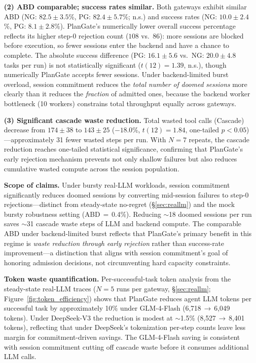 \documentclass[sigconf,review,anonymous]{acmart}
\begin{document}
\noindent\textbf{(2) ABD comparable; success rates similar.}
Both gateways exhibit similar ABD (NG: $82.5\pm3.5$\%, PG: $82.4\pm5.7$\%; n.s.) and success rates (NG: $10.0\pm2.4$\%, PG: $8.1\pm2.8$\%). PlanGate's numerically lower overall success percentage reflects its higher step-0 rejection count ($108$ vs.\ $86$): more sessions are blocked before execution, so fewer sessions enter the backend and have a chance to complete. The absolute success difference (PG: $16.1\pm5.6$ vs.\ NG: $20.0\pm4.8$ tasks per run) is not statistically significant ($t(12){=}1.39$, n.s.), though numerically PlanGate accepts fewer sessions. Under backend-limited burst overload, session commitment reduces the \emph{total number of doomed sessions} more clearly than it reduces the \emph{fraction} of admitted ones, because the backend worker bottleneck (10 workers) constrains total throughput equally across gateways.

\noindent\textbf{(3) Significant cascade waste reduction.}
Total wasted tool calls (Cascade) decrease from $174\pm38$ to $143\pm25$ ($-18.0$\%, $t(12){=}1.84$, one-tailed $p{<}0.05$)---approximately 31 fewer wasted steps per run. With $N{=}7$ repeats, the cascade reduction reaches one-tailed statistical significance, confirming that PlanGate's early rejection mechanism prevents not only shallow failures but also reduces cumulative wasted compute across the session population.

\textbf{Scope of claims.}
Under bursty real-LLM workloads, session commitment significantly reduces doomed sessions by converting mid-session failures to step-0 rejections---distinct from steady-state no-regret (\S\ref{sec:reallm}) and the mock bursty robustness setting (ABD$\,{=}\,$0.4\%). Reducing $\sim$18 doomed sessions per run saves $\sim$31 cascade waste steps of LLM and backend compute. The comparable ABD under backend-limited burst reflects that PlanGate's primary benefit in this regime is \emph{waste reduction through early rejection} rather than success-rate improvement---a distinction that aligns with session commitment's goal of honoring admission decisions, not circumventing hard capacity constraints.

\textbf{Token waste quantification.}
Per-successful-task token analysis from the steady-state real-LLM traces ($N{=}5$ runs per gateway, \S\ref{sec:reallm}; Figure~\ref{fig:token_efficiency}) shows that PlanGate reduces agent LLM tokens per successful task by approximately 10\% under GLM-4-Flash (6{,}718\,$\to$\,6{,}049 tokens). Under DeepSeek-V3 the reduction is modest at $\sim$1.5\% (8{,}527\,$\to$\,8{,}401 tokens), reflecting that under DeepSeek's tokenization per-step counts leave less margin for commitment-driven savings. The GLM-4-Flash saving is consistent with session commitment cutting off cascade waste before it consumes additional LLM calls.
\end{document}
